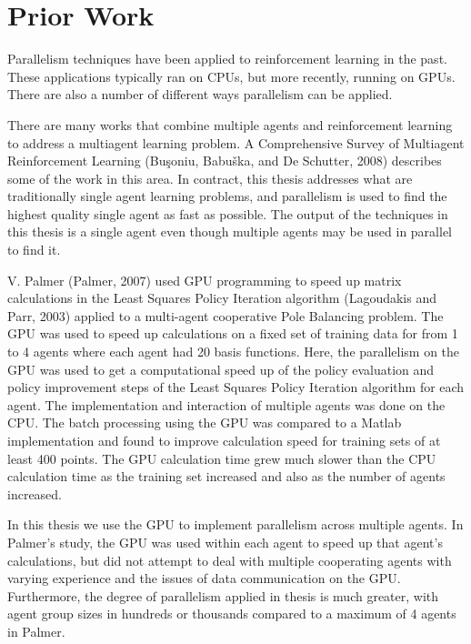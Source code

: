 \section{Prior Work}

Parallelism techniques have been applied to reinforcement learning in the past.  These applications typically ran on CPUs, but more recently, running on GPUs.  There are also a number of different ways parallelism can be applied.

There are many works that combine multiple agents and reinforcement learning to address a multiagent learning problem.  A Comprehensive Survey of Multiagent Reinforcement Learning (Buşoniu, Babuška, and De Schutter, 2008) describes some of the work in this area.  In contract, this thesis addresses what are traditionally single agent learning problems, and parallelism is used to find the highest quality single agent as fast as possible.  The output of the techniques in this thesis is a single agent even though multiple agents may be used in parallel to find it.

V. Palmer (Palmer, 2007) used GPU programming to speed up matrix calculations in the Least Squares Policy Iteration algorithm (Lagoudakis and Parr, 2003) applied to a multi-agent cooperative Pole Balancing problem.  The GPU was used to speed up calculations on a fixed set of training data for from 1 to 4 agents where each agent had 20 basis functions.  Here, the parallelism on the GPU was used to get a computational speed up of the policy evaluation and policy improvement steps of the Least Squares Policy Iteration algorithm for each agent.  The implementation and interaction of multiple agents was done on the CPU.  The batch processing using the GPU was compared to a Matlab implementation and found to improve calculation speed for training sets of at least 400 points.  The GPU calculation time grew much slower than the CPU calculation time as the training set increased and also as the number of agents increased.

In this thesis we use the GPU to implement parallelism across multiple agents.  In Palmer’s study, the GPU was used within each agent to speed up that agent’s calculations, but did not attempt to deal with multiple cooperating agents with varying experience and the issues of data communication on the GPU.  Furthermore, the degree of parallelism applied in thesis is much greater, with agent group sizes in hundreds or thousands compared to a maximum of 4 agents in Palmer.

